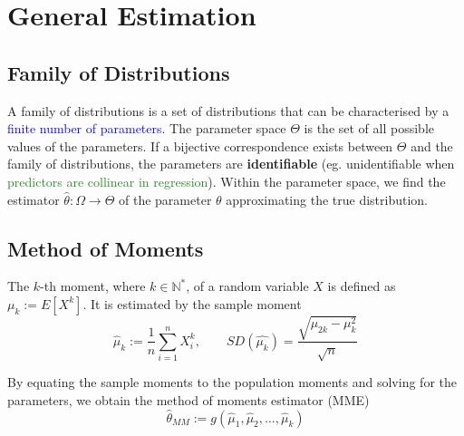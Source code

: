 \section{General Estimation}
\subsection{Family of Distributions}
A \textcolor{Bittersweet}{family of distributions} is a set of distributions
that can be characterised by a \textcolor{Blue}{finite number of parameters}.
The \textcolor{Bittersweet}{parameter space} $\Theta$ is the set of all
possible values of the parameters. If a bijective correspondence exists
between $\Theta$ and the family of distributions, the parameters are
\textbf{identifiable} (eg. unidentifiable when
\textcolor{ForestGreen}{predictors are collinear in regression}). Within the
parameter space, we find the estimator $\hat{\theta}: \Omega\to\Theta$ of the
parameter $\theta$ approximating the true distribution.

\subsection{Method of Moments}
The \textcolor{Bittersweet}{$k$-th moment}, where $k\in \mathbb{N}^{*}$, of a
random variable $X$ is defined as $\mu_k := E[X^k]$. It is estimated by the
\textcolor{Bittersweet}{sample moment} 
\[\hat{\mu}_k := \frac{1}{n}\sum_{i=1}^{n} X_i^k,\qquad
SD(\hat{\mu_k})=\frac{\sqrt{\mu_{2k}-\mu_k^{2}}}{\sqrt{n}}\]

By equating the sample moments to the population moments and solving for the
parameters, we obtain the \textcolor{Bittersweet}{method of moments estimator}
(MME)
\[\hat{\theta}_{MM} := g(\hat{\mu}_1, \hat{\mu}_2, \ldots, \hat{\mu}_k)\]
